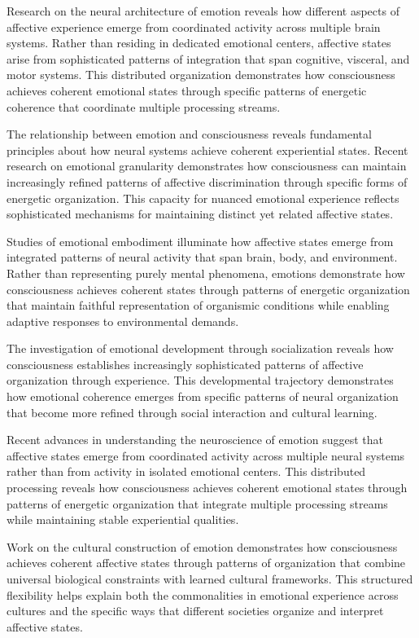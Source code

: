 \begin{refsection}
Research on the neural architecture of emotion \cite{Davidson2012} reveals how different aspects of affective experience emerge from coordinated activity across multiple brain systems. Rather than residing in dedicated emotional centers, affective states arise from sophisticated patterns of integration that span cognitive, visceral, and motor systems. This distributed organization demonstrates how consciousness achieves coherent emotional states through specific patterns of energetic coherence that coordinate multiple processing streams.

The relationship between emotion and consciousness reveals fundamental principles about how neural systems achieve coherent experiential states. Recent research on emotional granularity \cite{Barrett2017} demonstrates how consciousness can maintain increasingly refined patterns of affective discrimination through specific forms of energetic organization. This capacity for nuanced emotional experience reflects sophisticated mechanisms for maintaining distinct yet related affective states.

Studies of emotional embodiment \cite{Fuchs2019} illuminate how affective states emerge from integrated patterns of neural activity that span brain, body, and environment. Rather than representing purely mental phenomena, emotions demonstrate how consciousness achieves coherent states through patterns of energetic organization that maintain faithful representation of organismic conditions while enabling adaptive responses to environmental demands.

The investigation of emotional development through socialization \cite{Thompson2007} reveals how consciousness establishes increasingly sophisticated patterns of affective organization through experience. This developmental trajectory demonstrates how emotional coherence emerges from specific patterns of neural organization that become more refined through social interaction and cultural learning.

Recent advances in understanding the neuroscience of emotion \cite{Fox2019} suggest that affective states emerge from coordinated activity across multiple neural systems rather than from activity in isolated emotional centers. This distributed processing reveals how consciousness achieves coherent emotional states through patterns of energetic organization that integrate multiple processing streams while maintaining stable experiential qualities.

Work on the cultural construction of emotion \cite{Lutz1988} demonstrates how consciousness achieves coherent affective states through patterns of organization that combine universal biological constraints with learned cultural frameworks. This structured flexibility helps explain both the commonalities in emotional experience across cultures and the specific ways that different societies organize and interpret affective states.


\end{refsection}

